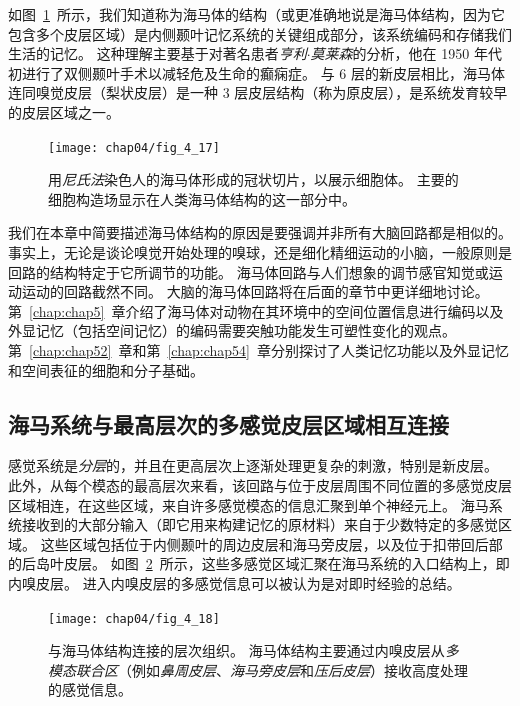 如图~\ref{fig:4_17}~所示，我们知道称为海马体的结构（或更准确地说是海马体结构，因为它包含多个皮层区域）是内侧颞叶记忆系统的关键组成部分，该系统编码和存储我们生活的记忆。 
这种理解主要基于对著名患者\textit{亨利$\cdot$莫莱森}的分析，他在 1950 年代初进行了双侧颞叶手术以减轻危及生命的癫痫症。
与 6 层的新皮层相比，海马体连同嗅觉皮层（梨状皮层）是一种 3 层皮层结构（称为原皮层），是系统发育较早的皮层区域之一。


\begin{figure}[htbp]
	\centering
	\texttt{[image: chap04/fig\_4\_17]}
	\caption{用\textit{尼氏法}染色人的海马体形成的冠状切片，以展示细胞体。
		主要的细胞构造场显示在人类海马体结构的这一部分中。}
	\label{fig:4_17}
\end{figure}


我们在本章中简要描述海马体结构的原因是要强调并非所有大脑回路都是相似的。
事实上，无论是谈论嗅觉开始处理的嗅球，还是细化精细运动的小脑，一般原则是回路的结构特定于它所调节的功能。
海马体回路与人们想象的调节感官知觉或运动运动的回路截然不同。
大脑的海马体回路将在后面的章节中更详细地讨论。 
第~\ref{chap:chap5}~章介绍了海马体对动物在其环境中的空间位置信息进行编码以及外显记忆（包括空间记忆）的编码需要突触功能发生可塑性变化的观点。 
第~\ref{chap:chap52}~章和第~\ref{chap:chap54}~章分别探讨了人类记忆功能以及外显记忆和空间表征的细胞和分子基础。



\subsection{海马系统与最高层次的多感觉皮层区域相互连接}

感觉系统是\textit{分层}的，并且在更高层次上逐渐处理更复杂的刺激，特别是新皮层。
此外，从每个模态的最高层次来看，该回路与位于皮层周围不同位置的多感觉皮层区域相连，在这些区域，来自许多感觉模态的信息汇聚到单个神经元上。
海马系统接收到的大部分输入（即它用来构建记忆的原材料）来自于少数特定的多感觉区域。
这些区域包括位于内侧颞叶的周边皮层和海马旁皮层，以及位于扣带回后部的后岛叶皮层。
如图~\ref{fig:4_18}~所示，这些多感觉区域汇聚在海马系统的入口结构上，即内嗅皮层。 
进入内嗅皮层的多感觉信息可以被认为是对即时经验的总结。


\begin{figure}[htbp]
	\centering
	\texttt{[image: chap04/fig\_4\_18]}
	\caption{与海马体结构连接的层次组织。
		海马体结构主要通过内嗅皮层从\textit{多模态联合区}（例如\textit{鼻周皮层}、\textit{海马旁皮层}和\textit{压后皮层}）接收高度处理的感觉信息。}
	\label{fig:4_18}
\end{figure}



